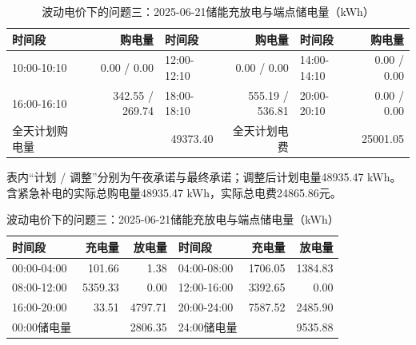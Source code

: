 \begin{table}[H]\centering\small\setlength{\tabcolsep}{5pt}
\caption{波动电价下的问题三：2025-06-21购电结果（电量：kWh；费用：元）}
\begin{tabular}{lrlrlr}\toprule
时间段 & 购电量 & 时间段 & 购电量 & 时间段 & 购电量 \\\midrule
10:00-10:10 & 0.00 / 0.00 & 12:00-12:10 & 0.00 / 0.00 & 14:00-14:10 & 0.00 / 0.00\\
16:00-16:10 & 342.55 / 269.74 & 18:00-18:10 & 555.19 / 536.81 & 20:00-20:10 & 0.00 / 0.00\\
\midrule 全天计划购电量 & \multicolumn{2}{r}{49373.40} & 全天计划电费 & \multicolumn{2}{r}{25001.05}\\\bottomrule
\end{tabular}
\par\vspace{2pt}\footnotesize
表内“计划 / 调整”分别为午夜承诺与最终承诺；调整后计划电量48935.47 kWh。
含紧急补电的实际总购电量48935.47 kWh，实际总电费24865.86元。
\vspace{3pt}\small
\caption{波动电价下的问题三：2025-06-21储能充放电与端点储电量（kWh）}
\begin{tabular}{lrrlrr}\toprule
时间段 & 充电量 & 放电量 & 时间段 & 充电量 & 放电量 \\\midrule
00:00-04:00 & 101.66 & 1.38 & 04:00-08:00 & 1706.05 & 1384.83\\
08:00-12:00 & 5359.33 & 0.00 & 12:00-16:00 & 3392.65 & 0.00\\
16:00-20:00 & 33.51 & 4797.71 & 20:00-24:00 & 7587.52 & 2485.90\\
\midrule 00:00储电量 & \multicolumn{2}{r}{2806.35} & 24:00储电量 & \multicolumn{2}{r}{9535.88}\\\bottomrule
\end{tabular}\end{table}
